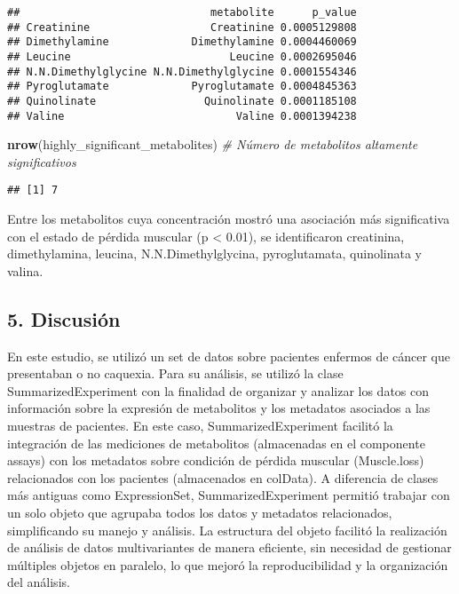 \documentclass[
]{article}
\newenvironment{Shaded}{\begin{snugshade}}{\end{snugshade}}
\newcommand{\CommentTok}[1]{\textcolor[rgb]{0.56,0.35,0.01}{\textit{#1}}}
\newcommand{\FunctionTok}[1]{\textcolor[rgb]{0.13,0.29,0.53}{\textbf{#1}}}
\newcommand{\NormalTok}[1]{#1}
\begin{document}
\begin{verbatim}
##                              metabolite      p_value
## Creatinine                   Creatinine 0.0005129808
## Dimethylamine             Dimethylamine 0.0004460069
## Leucine                         Leucine 0.0002695046
## N.N.Dimethylglycine N.N.Dimethylglycine 0.0001554346
## Pyroglutamate             Pyroglutamate 0.0004845363
## Quinolinate                 Quinolinate 0.0001185108
## Valine                           Valine 0.0001394238
\end{verbatim}

\begin{Shaded}
\begin{Highlighting}[]
\FunctionTok{nrow}\NormalTok{(highly\_significant\_metabolites)  }\CommentTok{\# Número de metabolitos altamente significativos}
\end{Highlighting}
\end{Shaded}

\begin{verbatim}
## [1] 7
\end{verbatim}

Entre los metabolitos cuya concentración mostró una asociación más
significativa con el estado de pérdida muscular (p \textless{} 0.01), se
identificaron creatinina, dimethylamina, leucina, N.N.Dimethylglycina,
pyroglutamata, quinolinata y valina.

\subsection{5. Discusión}\label{discusiuxf3n}

En este estudio, se utilizó un set de datos sobre pacientes enfermos de
cáncer que presentaban o no caquexia. Para su análisis, se utilizó la
clase SummarizedExperiment con la finalidad de organizar y analizar los
datos con información sobre la expresión de metabolitos y los metadatos
asociados a las muestras de pacientes. En este caso,
SummarizedExperiment facilitó la integración de las mediciones de
metabolitos (almacenadas en el componente assays) con los metadatos
sobre condición de pérdida muscular (Muscle.loss) relacionados con los
pacientes (almacenados en colData). A diferencia de clases más antiguas
como ExpressionSet, SummarizedExperiment permitió trabajar con un solo
objeto que agrupaba todos los datos y metadatos relacionados,
simplificando su manejo y análisis. La estructura del objeto facilitó la
realización de análisis de datos multivariantes de manera eficiente, sin
necesidad de gestionar múltiples objetos en paralelo, lo que mejoró la
reproducibilidad y la organización del análisis.
\end{document}
